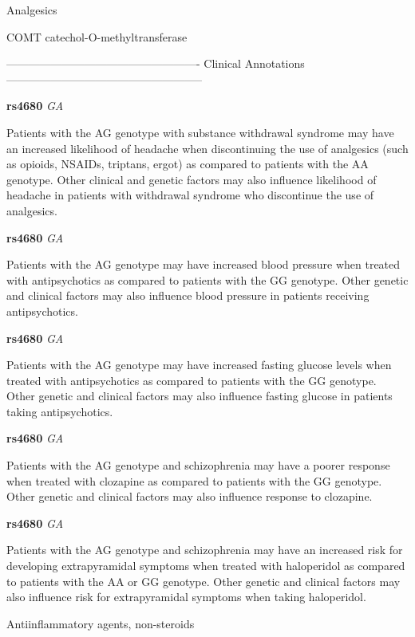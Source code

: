\documentclass{resume} %
\begin{document}
\begin{rSection}{ Analgesics }
\begin{rSubsection}{ COMT }{ catechol-O-methyltransferase }{}{}
\item[] ---------------------------------------------------- Clinical Annotations -----------------------------------------------------\newline
\item \textbf{ rs4680 } \textit{ GA }
\item[] Patients with the AG genotype with substance withdrawal syndrome may have an increased likelihood of headache when discontinuing the use of analgesics (such as opioids, NSAIDs, triptans, ergot) as compared to patients with the AA genotype. Other clinical and genetic factors may also influence likelihood of headache in patients with withdrawal syndrome who discontinue the use of analgesics.\item \textbf{ rs4680 } \textit{ GA }
\item[] Patients with the AG genotype may have increased blood pressure when treated with antipsychotics as compared to patients with the GG genotype. Other genetic and clinical factors may also influence blood pressure in patients receiving antipsychotics.\item \textbf{ rs4680 } \textit{ GA }
\item[] Patients with the AG genotype may have increased fasting glucose levels when treated with antipsychotics as compared to patients with the GG genotype. Other genetic and clinical factors may also influence fasting glucose in patients taking antipsychotics.\item \textbf{ rs4680 } \textit{ GA }
\item[] Patients with the AG genotype and schizophrenia may have a poorer response when treated with clozapine as compared to patients with the GG genotype. Other genetic and clinical factors may also influence response to clozapine.\item \textbf{ rs4680 } \textit{ GA }
\item[] Patients with the AG genotype and schizophrenia may have an increased risk for developing extrapyramidal symptoms when treated with haloperidol as compared to patients with the AA or GG genotype. Other genetic and clinical factors may also influence risk for extrapyramidal symptoms when taking haloperidol.
\end{rSubsection}

\end{rSection}\begin{rSection}{ Antiinflammatory agents, non-steroids }
\item[]


\end{rSection}
\end{document}
